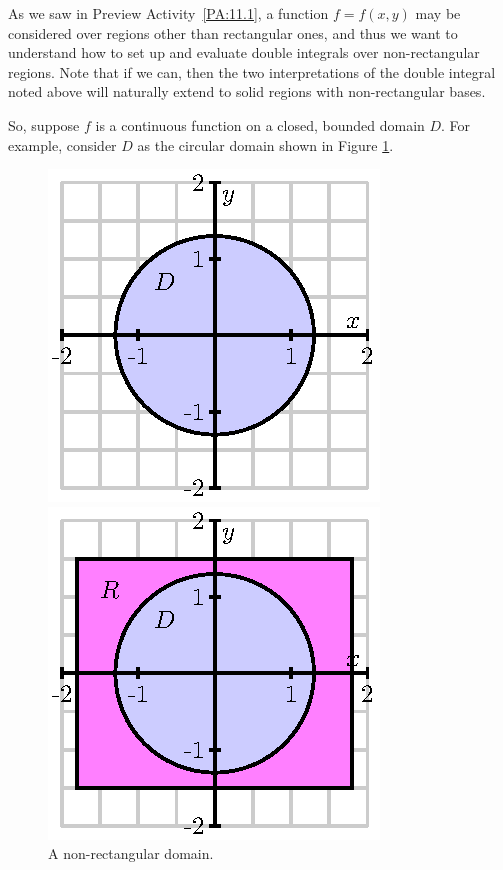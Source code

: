 As we saw in Preview Activity~\ref{PA:11.1}, a function $f = f(x,y)$ may be considered over regions other than rectangular ones, and thus we want to understand how to set up and evaluate double integrals over non-rectangular regions.  Note that if we can, then the two interpretations of the double integral noted above will naturally extend to solid regions with non-rectangular bases.

So, suppose $f$ is a continuous function on a closed, bounded domain $D$. For example, consider $D$ as the circular domain shown in Figure \ref{F:11.3.nonrect_domain_1}.
\begin{figure}[ht]
\begin{center}
\begin{minipage}{2.5in}
\begin{center}
  \includegraphics{figures/fig_11_3_circular.eps}
\end{center}
\caption{A non-rectangular domain.}
\label{F:11.3.nonrect_domain_1}
\end{minipage} \hspace{0.5in}
\begin{minipage}{2.5in}
\begin{center}
  \includegraphics{figures/fig_11_3_circular_rect.eps}

\end{center}
\end{minipage}
\end{center}
\end{figure}
